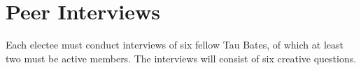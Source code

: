 \section{Peer Interviews}
Each electee must conduct interviews of six fellow Tau
Bates, of which at least two must be active members. The interviews will consist of six
creative questions.

